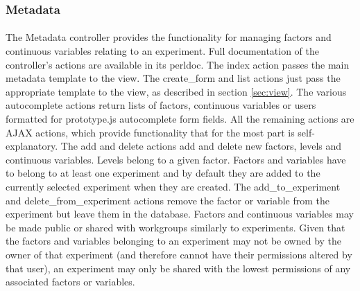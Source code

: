 \subsubsection{Metadata}
\label{sec:controller_metadata}

\paragraph{}
The Metadata controller provides the functionality for managing factors and continuous variables relating to an experiment. Full documentation of the controller's actions are available in its perldoc. The index action passes the main metadata template to the view. The create\_form and list actions just pass the appropriate template to the view, as described in section \ref{sec:view}. The various autocomplete actions return lists of factors, continuous variables or users formatted for prototype.js autocomplete form fields. All the remaining actions are AJAX actions, which  provide functionality that for the most part is self-explanatory. The add and delete actions add and delete new factors, levels and continuous variables. Levels belong to a given factor. Factors and variables have to belong to at least one experiment and by default they are added to the currently selected experiment when they are created. The add\_to\_experiment and delete\_from\_experiment actions remove the factor or variable from the experiment but leave them in the database. Factors and continuous variables may be made public or shared with workgroups similarly to experiments. Given that the factors and variables belonging to an experiment may not be owned by the owner of that experiment (and therefore cannot have their permissions altered by that user), an experiment may only be shared with the lowest permissions of any associated factors or variables. 

% 

